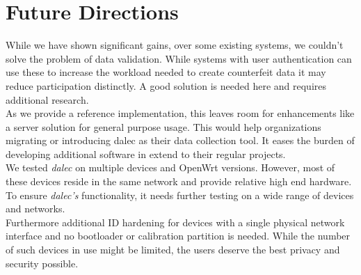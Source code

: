 %
\section{Future Directions}

    While we have shown significant gains, over some existing systems, we couldn't solve the problem of data validation. While systems with user authentication can use these to increase the workload needed to create counterfeit data it may reduce participation distinctly. A good solution is needed here and requires additional research.\\
    As we provide a reference implementation, this leaves room for enhancements like a server solution for general purpose usage. This would help organizations migrating or introducing dalec as their data collection tool. It eases the burden of developing additional software in extend to their regular projects.\\
    We tested \textit{dalec} on multiple devices and OpenWrt versions. However, most of these  devices reside in the same network and provide relative high end hardware.
    To ensure \textit{dalec's} functionality, it needs further testing on a wide range of devices and networks.\\
    Furthermore additional ID hardening for devices with a single physical network interface and no bootloader or calibration partition is needed. While the number of such devices in use might be limited, the users deserve the best privacy and security possible.
    
